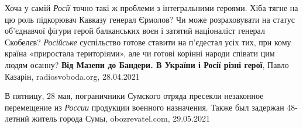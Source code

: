 Хоча у самій \emph{Росії} точно такі ж проблеми з інтегральними героями. Хіба
тягне на цю роль підкорювач Кавказу генерал Єрмолов? Чи може розраховувати на
статус об'єднавчої фігури герой балканських воєн і затятий націоналіст генерал
Скобелєв? \emph{Російське} суспільство готове ставити на п'єдестал усіх тих,
при кому країна «приростала територіями», але чи готові корінні народи співати
цим людям осанну? \textbf{Від Мазепи до Бандери. В України і Росії різні
герої}, Павло Казарін, radiosvoboda.org, 28.04.2021

В пятницу, 28 мая, пограничники Сумского отряда пресекли незаконное перемещение
из \emph{России} продукции военного назначения. Также был задержан 48-летний житель
города Сумы, obozrevatel.com, 29.05.2021

